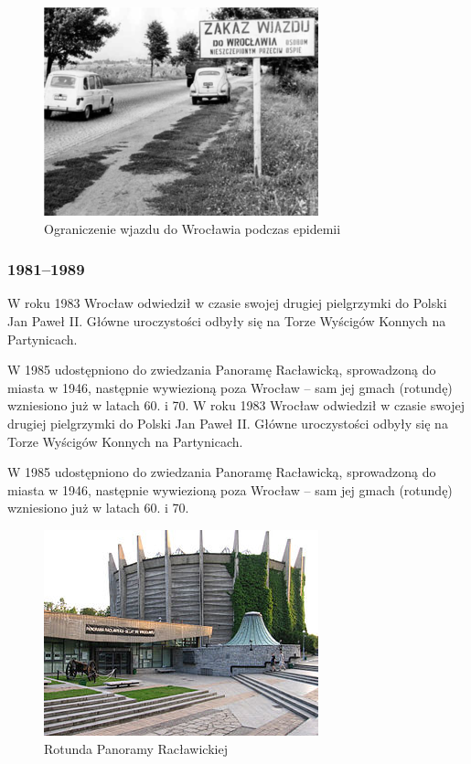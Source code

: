\documentclass{article}
\begin{document}
\begin{figure}[htbp!]
\centering
\includegraphics[scale=1.0]{17.png}
\caption{Ograniczenie wjazdu do Wrocławia podczas epidemii}
\label{fig:15}
\end{figure}

\newpage
\subsubsection{1981–1989}

W roku 1983 Wrocław odwiedził w czasie swojej drugiej pielgrzymki do Polski Jan Paweł II. Główne uroczystości odbyły się na Torze Wyścigów Konnych na Partynicach.

W 1985 udostępniono do zwiedzania Panoramę Racławicką, sprowadzoną do miasta w 1946, następnie wywiezioną poza Wrocław – sam jej gmach (rotundę) wzniesiono już w latach 60. i 70.
W roku 1983 Wrocław odwiedził w czasie swojej drugiej pielgrzymki do Polski Jan Paweł II. Główne uroczystości odbyły się na Torze Wyścigów Konnych na Partynicach.

W 1985 udostępniono do zwiedzania Panoramę Racławicką, sprowadzoną do miasta w 1946, następnie wywiezioną poza Wrocław – sam jej gmach (rotundę) wzniesiono już w latach 60. i 70.

\begin{figure}[htbp!]
\centering
\includegraphics[scale=1.0]{18.jpg}
\caption{Rotunda Panoramy Racławickiej}
\label{fig:16}
\end{figure}
\newpage
\end{document}

